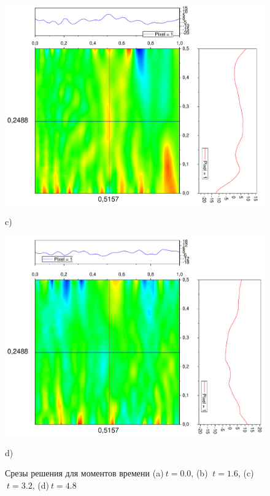 \documentclass[a4paper,12pt]{article}
\begin{document}
\begin{figure}[h!]
\begin{center}
\begin{minipage}[h]{0.24\linewidth}
		\end{minipage}
		\begin{minipage}[h]{0.24\linewidth}
			\includegraphics[width=\textwidth]{graphs/graphs_l/v2/wave_t-16_v2_srez} \begin{center}	c)	\end{center}
		\end{minipage}
		\begin{minipage}[h]{0.24\linewidth}
			\includegraphics[width=\textwidth]{graphs/graphs_l/v2/wave_t-24_v2_srez} \begin{center}	d)	\end{center}
		\end{minipage}
	\end{center}
	\caption{Срезы решения для моментов времени (a)$\ t = 0.0$, (b) $\ t = 1.6$, (c)$\ t = 3.2$, (d)$\ t = 4.8$}
\end{figure}
\end{document}
